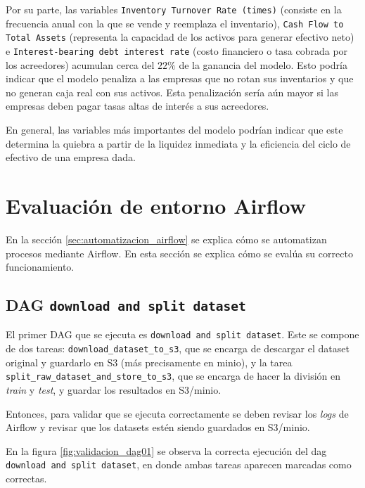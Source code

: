 Por su parte, las variables \texttt{Inventory Turnover Rate (times)} (consiste en la frecuencia anual con la que se vende y reemplaza el inventario), \texttt{Cash Flow to Total Assets} (representa la capacidad de los activos para generar efectivo neto) e \texttt{Interest-bearing debt interest rate} (costo financiero o tasa cobrada por los acreedores) acumulan cerca del $22\%$ de la ganancia del modelo. Esto podría indicar que el modelo penaliza a las empresas que no rotan sus inventarios y que no generan caja real con sus activos. Esta penalización sería aún mayor si las empresas deben pagar tasas altas de interés a sus acreedores.

En general, las variables más importantes del modelo podrían indicar que este determina la quiebra a partir de la liquidez inmediata y la eficiencia del ciclo de efectivo de una empresa dada.

\section{Evaluación de entorno Airflow}
\label{sec:evaluacion_airflow}

En la sección \ref{sec:automatizacion_airflow} se explica cómo se automatizan procesos mediante Airflow. En esta sección se explica cómo se evalúa su correcto funcionamiento.

\subsection{DAG \texttt{download and split dataset}}

El primer DAG \citep{WEBSITE:airflow_dags} que se ejecuta es \texttt{download and split dataset}. Este se compone de dos tareas: \texttt{download\_dataset\_to\_s3}, que se encarga de descargar el dataset original y guardarlo en S3 (más precisamente en minio), y la tarea \texttt{split\_raw\_dataset\_and\_store\_to\_s3}, que se encarga de hacer la división en \textit{train} y \textit{test}, y guardar los resultados en S3/minio.

Entonces, para validar que se ejecuta correctamente se deben revisar los \textit{logs} de Airflow y revisar que los datasets estén siendo guardados en S3/minio.

En la figura \ref{fig:validacion_dag01} se observa la correcta ejecución del dag \texttt{download and split dataset}, en donde ambas tareas aparecen marcadas como correctas.

